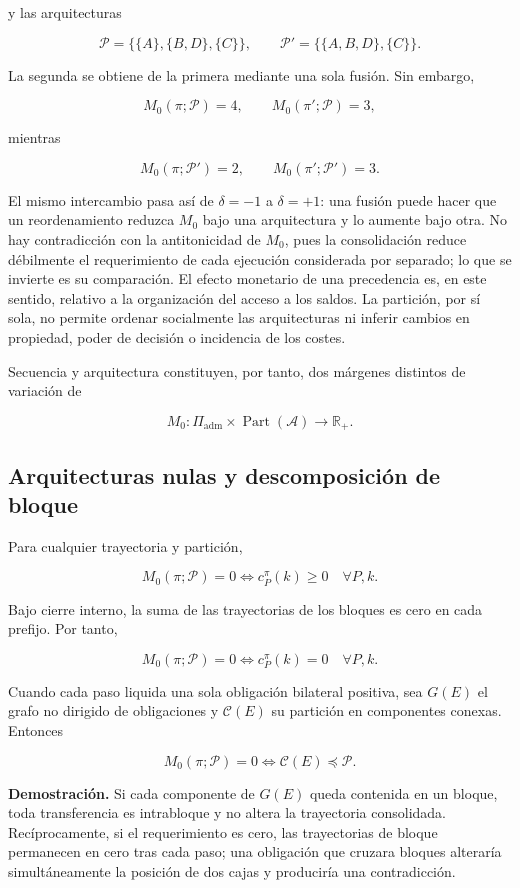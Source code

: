 \documentclass[10pt,a5paper,twoside]{article}
\begin{document}
y las arquitecturas

\[
\mathcal P=\{\{A\},\{B,D\},\{C\}\},
\qquad
\mathcal P'=\{\{A,B,D\},\{C\}\}.
\]

La segunda se obtiene de la primera mediante una sola fusión. Sin embargo,

\[
M_0(\pi;\mathcal P)=4,
\qquad
M_0(\pi';\mathcal P)=3,
\]

mientras

\[
M_0(\pi;\mathcal P')=2,
\qquad
M_0(\pi';\mathcal P')=3.
\]

El mismo intercambio pasa así de \(\delta=-1\) a \(\delta=+1\): una
fusión puede hacer que un reordenamiento reduzca \(M_0\) bajo una arquitectura
y lo aumente bajo otra. No hay contradicción con la antitonicidad de \(M_0\),
pues la consolidación reduce débilmente el requerimiento de cada ejecución
considerada por separado; lo que se invierte es su comparación. El efecto
monetario de una precedencia es, en este sentido, relativo a la organización
del acceso a los saldos. La partición, por sí sola, no permite ordenar
socialmente las arquitecturas ni inferir cambios en propiedad, poder de
decisión o incidencia de los costes.

Secuencia y arquitectura constituyen, por tanto, dos márgenes distintos de variación de

\[
M_0:\Pi_{\mathrm{adm}}\times\operatorname{Part}(\mathcal A)
\longrightarrow\mathbb R_+.
\]

\subsection{Arquitecturas nulas y descomposición de bloque}\label{arquitecturas-nulas-y-descomposiciuxf3n-de-bloque}

Para cualquier trayectoria y partición,

\[
M_0(\pi;\mathcal P)=0
\iff
c^\pi_P(k)\ge0
\quad
\forall P,k.
\]

Bajo cierre interno, la suma de las trayectorias de los bloques es cero
en cada prefijo. Por tanto,

\[
M_0(\pi;\mathcal P)=0
\iff
c^\pi_P(k)=0
\quad
\forall P,k.
\]

Cuando cada paso liquida una sola obligación bilateral positiva, sea
\(G(E)\) el grafo no dirigido de obligaciones y \(\mathcal C(E)\) su
partición en componentes conexas. Entonces

\[
M_0(\pi;\mathcal P)=0
\iff
\mathcal C(E)\preceq\mathcal P.
\]

\textbf{Demostración.} Si cada componente de \(G(E)\) queda contenida en
un bloque, toda transferencia es intrabloque y no altera la trayectoria
consolidada. Recíprocamente, si el requerimiento es cero, las
trayectorias de bloque permanecen en cero tras cada paso; una obligación
que cruzara bloques alteraría simultáneamente la posición de dos cajas y
produciría una contradicción.
\end{document}
